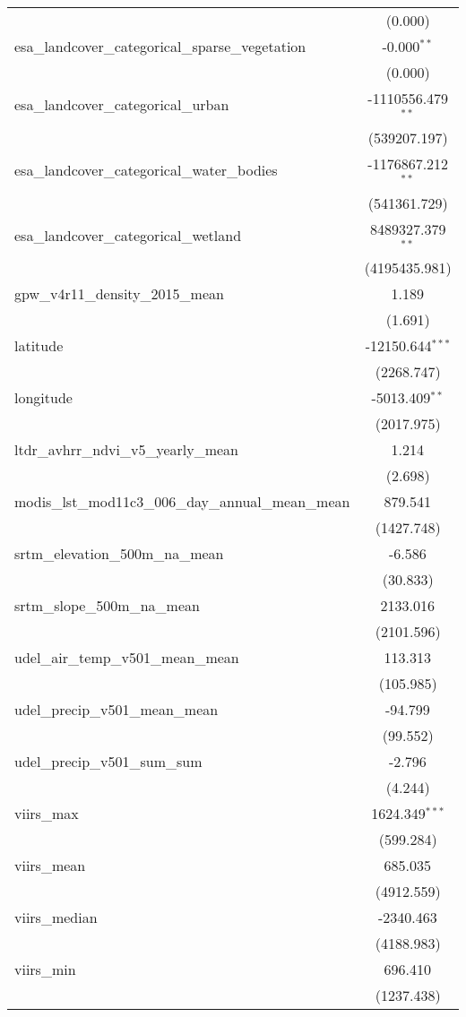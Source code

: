 \begin{table}[!htbp]
\begin{tabular}{@{\extracolsep{5pt}}lc}
  & (0.000) \\
 esa_landcover_categorical_sparse_vegetation & -0.000$^{**}$ \\
  & (0.000) \\
 esa_landcover_categorical_urban & -1110556.479$^{**}$ \\
  & (539207.197) \\
 esa_landcover_categorical_water_bodies & -1176867.212$^{**}$ \\
  & (541361.729) \\
 esa_landcover_categorical_wetland & 8489327.379$^{**}$ \\
  & (4195435.981) \\
 gpw_v4r11_density_2015_mean & 1.189$^{}$ \\
  & (1.691) \\
 latitude & -12150.644$^{***}$ \\
  & (2268.747) \\
 longitude & -5013.409$^{**}$ \\
  & (2017.975) \\
 ltdr_avhrr_ndvi_v5_yearly_mean & 1.214$^{}$ \\
  & (2.698) \\
 modis_lst_mod11c3_006_day_annual_mean_mean & 879.541$^{}$ \\
  & (1427.748) \\
 srtm_elevation_500m_na_mean & -6.586$^{}$ \\
  & (30.833) \\
 srtm_slope_500m_na_mean & 2133.016$^{}$ \\
  & (2101.596) \\
 udel_air_temp_v501_mean_mean & 113.313$^{}$ \\
  & (105.985) \\
 udel_precip_v501_mean_mean & -94.799$^{}$ \\
  & (99.552) \\
 udel_precip_v501_sum_sum & -2.796$^{}$ \\
  & (4.244) \\
 viirs_max & 1624.349$^{***}$ \\
  & (599.284) \\
 viirs_mean & 685.035$^{}$ \\
  & (4912.559) \\
 viirs_median & -2340.463$^{}$ \\
  & (4188.983) \\
 viirs_min & 696.410$^{}$ \\
  & (1237.438) \\

\end{tabular}
\end{table}
